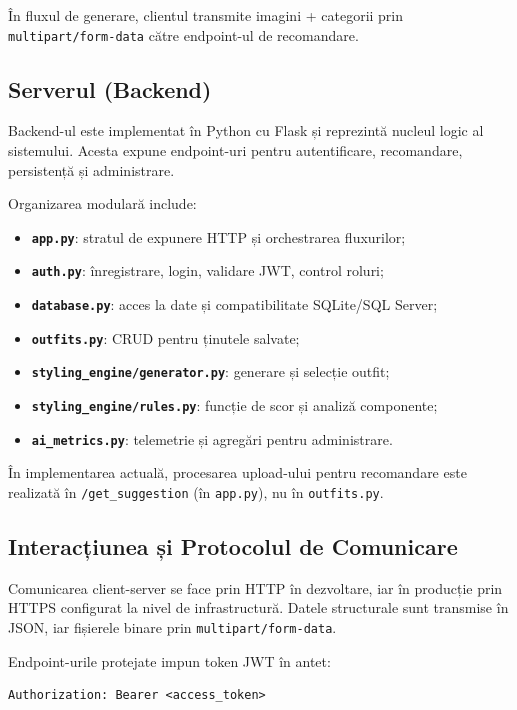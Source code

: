 În fluxul de generare, clientul transmite imagini + categorii prin \texttt{multipart/form-data} către endpoint-ul de recomandare.

\subsection{Serverul (Backend)}

Backend-ul este implementat în Python cu Flask și reprezintă nucleul logic al sistemului. Acesta expune endpoint-uri pentru autentificare, recomandare, persistență și administrare.

Organizarea modulară include:
\begin{itemize}
    \item \textbf{\texttt{app.py}}: stratul de expunere HTTP și orchestrarea fluxurilor;
    \item \textbf{\texttt{auth.py}}: înregistrare, login, validare JWT, control roluri;
    \item \textbf{\texttt{database.py}}: acces la date și compatibilitate SQLite/SQL Server;
    \item \textbf{\texttt{outfits.py}}: CRUD pentru ținutele salvate;
    \item \textbf{\texttt{styling\_engine/generator.py}}: generare și selecție outfit;
    \item \textbf{\texttt{styling\_engine/rules.py}}: funcție de scor și analiză componente;
    \item \textbf{\texttt{ai\_metrics.py}}: telemetrie și agregări pentru administrare.
\end{itemize}

În implementarea actuală, procesarea upload-ului pentru recomandare este realizată în \texttt{/get\_suggestion} (în \texttt{app.py}), nu în \texttt{outfits.py}.

\subsection{Interacțiunea și Protocolul de Comunicare}

Comunicarea client-server se face prin HTTP în dezvoltare, iar în producție prin HTTPS configurat la nivel de infrastructură. Datele structurale sunt transmise în JSON, iar fișierele binare prin \texttt{multipart/form-data}.

Endpoint-urile protejate impun token JWT în antet:
\begin{verbatim}
Authorization: Bearer <access_token>
\end{verbatim}

